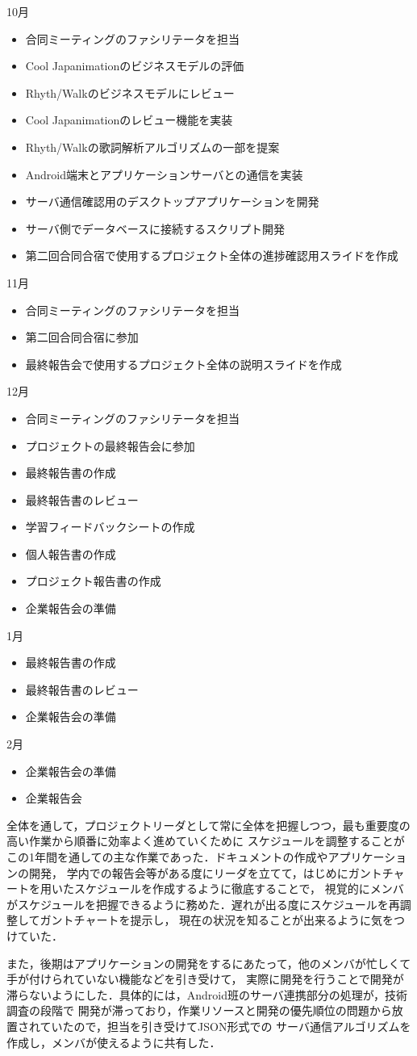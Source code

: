 10月
\begin{itemize}
\item 合同ミーティングのファシリテータを担当
\item Cool Japanimationのビジネスモデルの評価
\item Rhyth/Walkのビジネスモデルにレビュー
\item Cool Japanimationのレビュー機能を実装
\item Rhyth/Walkの歌詞解析アルゴリズムの一部を提案
\item Android端末とアプリケーションサーバとの通信を実装
\item サーバ通信確認用のデスクトップアプリケーションを開発
\item サーバ側でデータベースに接続するスクリプト開発
\item 第二回合同合宿で使用するプロジェクト全体の進捗確認用スライドを作成
\end{itemize}
11月
\begin{itemize}
\item 合同ミーティングのファシリテータを担当
\item 第二回合同合宿に参加
\item 最終報告会で使用するプロジェクト全体の説明スライドを作成
\end{itemize}
12月
\begin{itemize}
\item 合同ミーティングのファシリテータを担当
\item プロジェクトの最終報告会に参加
\item 最終報告書の作成
\item 最終報告書のレビュー
\item 学習フィードバックシートの作成
\item 個人報告書の作成
\item プロジェクト報告書の作成
\item 企業報告会の準備
\end{itemize}
1月
\begin{itemize}
\item 最終報告書の作成
\item 最終報告書のレビュー
\item 企業報告会の準備
\end{itemize}
2月
\begin{itemize}
\item 企業報告会の準備
\item 企業報告会
\end{itemize}

全体を通して，プロジェクトリーダとして常に全体を把握しつつ，最も重要度の高い作業から順番に効率よく進めていくために
スケジュールを調整することがこの1年間を通しての主な作業であった．ドキュメントの作成やアプリケーションの開発，
学内での報告会等がある度にリーダを立てて，はじめにガントチャートを用いたスケジュールを作成するように徹底することで，
視覚的にメンバがスケジュールを把握できるように務めた．遅れが出る度にスケジュールを再調整してガントチャートを提示し，
現在の状況を知ることが出来るように気をつけていた．

また，後期はアプリケーションの開発をするにあたって，他のメンバが忙しくて手が付けられていない機能などを引き受けて，
実際に開発を行うことで開発が滞らないようにした．具体的には，Android班のサーバ連携部分の処理が，技術調査の段階で
開発が滞っており，作業リソースと開発の優先順位の問題から放置されていたので，担当を引き受けてJSON形式での
サーバ通信アルゴリズムを作成し，メンバが使えるように共有した．

